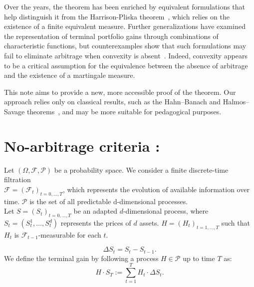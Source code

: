 \documentclass[review]{elsarticle}
\begin{document}
\hspace{0.5cm}Over the years, the theorem has been enriched by equivalent formulations that help distinguish it from the Harrison-Pliska theorem~\cite{Harrison1981}, which relies on the existence of a finite equivalent measure. Further generalizations have examined the representation of terminal portfolio gains through combinations of characteristic functions, but counterexamples show that such formulations may fail to eliminate arbitrage when convexity is absent~\cite{Yan1980}. Indeed, convexity appears to be a critical assumption for the equivalence between the absence of arbitrage and the existence of a martingale measure.

This note aims to provide a new, more accessible proof of the theorem. Our approach relies only on classical results, such as the Hahn–Banach and Halmos–Savage theorems~\cite{Halmos1949}, and may be more suitable for pedagogical purposes.





\section{No-arbitrage criteria :}


\hspace{0.5cm}Let $(\Omega, \mathcal{F}, \mathcal{P})$ be a probability space.  
We consider a finite discrete-time filtration\\ $\mathcal{F} = (\mathcal{F}_t)_{t=0,\dots,T}$, which represents the evolution of available information over time.
$\mathcal{P}$ is the set of all predictable d-dimensional processes.\\
Let $S = (S_t)_{t=0,\dots,T}$ be an adapted $d$-dimensional  process, where $S_t = (S_t^1, \dots, S_t^d)$ represents the prices of $d$ assets.
$H = (H_t)_{t=1,\dots,T}$ such that $H_t$ is $\mathcal{F}_{t-1}$-measurable for each $t$.

$$
\Delta S_t = S_t - S_{t-1}.
$$
We define the terminal gain by following a process $H \in \mathcal{P}$ up to time $T$ as:
\begin{equation}
H \cdot S_T := \sum_{t=1}^T H_t \cdot \Delta S_t.
\label{eq_1er_Princ_Thermo-1}
\end{equation}
 
\end{document}
